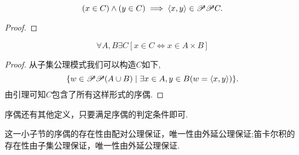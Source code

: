 \begin{lemma}
    \[(x\in C)\wedge(y\in C)\implies\langle x,y\rangle\in\mathscr{P}\mathscr{P} C.\]
\end{lemma}
\begin{proof}
\end{proof}

\begin{corollary}
    \[\forall A,B\exists C[x\in C\iff x\in A\times B]\]
\end{corollary}
\begin{proof}
    从子集公理模式我们可以构造$C$如下,
    \[\{w\in\mathscr{P}\mathscr{P}(A\cup B)\mid \exists x\in A,y\in B(w=\langle x,y\rangle)\}.\]由引理可知$C$包含了所有这样形式的序偶.
\end{proof}
序偶还有其他定义，只要满足序偶的判定条件即可.

\begin{note}
    这一小子节的序偶的存在性由配对公理保证，唯一性由外延公理保证;笛卡尔积的存在性由子集公理保证，唯一性由外延公理保证.
\end{note}

    